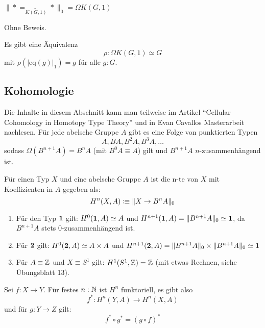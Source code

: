 \begin{bemerkung}
  $\|\ast=_{\widetilde{K(G,1)}}\ast\|_0=\Omega K(G,1)$
\end{bemerkung}
\begin{beweis}
  Ohne Beweis.
\end{beweis}

\begin{fakt}
  Es gibt eine Äquivalenz
  \[
    \rho:\Omega K(G,1) \simeq G
  \]
  mit $\rho(|\mathrm{eq}(g)|_1)=g$ für alle $g:G$.
\end{fakt}

\subsection{Kohomologie}
Die Inhalte in diesem Abschnitt kann man teilweise im Artikel ``Cellular Cohomology in Homotopy Type Theory'' und in Evan Cavallos Masterarbeit nachlesen.
Für jede abelsche Gruppe $A$ gibt es eine Folge von punktierten Typen
\[
  A, BA, B^2A, B^3A, \dots
\]
sodass $\Omega (B^{n+1}A)=B^nA$ (mit $B^0A\equiv A$) gilt und $B^{n+1}A$ $n$-zusammenhängend ist.
\begin{definition}
  Für einen Typ $X$ und eine abelsche Gruppe $A$ ist die n-te  von $X$ mit Koeffizienten in $A$ gegeben als:
  \[
    H^n(X,A)\vcentcolon\mspace{-1.2mu}\equiv \| X\to B^n A\|_0
  \]
\end{definition}
\begin{beispiel}
  \label{bsp:kohom}
  \begin{enumerate}
  \item Für den Typ $\mathbf{1}$ gilt: $H^0(\mathbf{1},A)\simeq A$ und $H^{n+1}(\mathbf{1},A)=\|B^{n+1}A\|_0\simeq\mathbf{1}$, da $B^{n+1}A$ stets 0-zusammenhängend ist.
  \item Für $\mathbf{2}$ gilt: $H^0(\mathbf{2},A)\simeq A\times A$ und $H^{n+1}(\mathbf{2},A)=\|B^{n+1}A\|_0\times \|B^{n+1}A\|_0\simeq\mathbf{1}$
  \item Für $A\equiv \mathbb{Z}$ und $X\equiv S^1$ gilt: $H^1(S^1,\mathbb{Z})=\mathbb{Z}$ (mit etwas Rechnen, siehe Übungsblatt 13).
  \end{enumerate}
\end{beispiel}

\begin{bemerkung}
  Sei $f:X\to Y$.
  Für festes $n:\mathbb{N}$ ist $H^n$ funktoriell, es gibt also
  \[
    f^\ast:H^n(Y,A)\to H^n(X,A)
  \]
  und für $g:Y\to Z$ gilt:
  \[
    f^\ast \circ g^\ast = (g\circ f)^\ast
  \]
\end{bemerkung}

